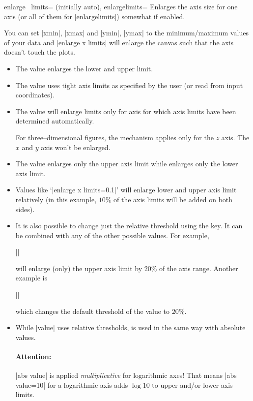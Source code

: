 \begin{pgfplotsxykeylist}{enlarge \x\ limits= (initially auto),
	enlargelimits=}
Enlarges the axis size for one axis (or all of them for |enlargelimits|) somewhat if enabled.

You can set |xmin|, |xmax| and |ymin|, |ymax| to the minimum/maximum values of your data and |enlarge x limits| will enlarge the canvas such that the axis doesn't touch the plots.

\begin{itemize}
	\item The value  enlarges the lower and upper limit.
	\item The value  uses tight axis limits as specified by the user (or read from input coordinates).
	\item The value  will enlarge limits only for axis for which axis limits have been determined automatically.

	For three--dimensional figures, the  mechanism applies only for the $z$ axis. The $x$ and $y$ axis won't be enlarged. 
	\item The value  enlarges only the upper axis limit while  enlarges only the lower axis limit.
	\item Values like `|enlarge x limits=0.1|' will enlarge lower and upper axis limit relatively (in this example, $10\%$ of the axis limits will be added on both sides).
	\item It is also possible to change just the relative threshold using the  key. It can be combined with any of the other possible values. For example, 

		||
	
	will enlarge (only) the upper axis limit by $20\%$ of the axis range. Another example is

		||

	which changes the default threshold of the  value to $20\%$.
	\item While |value| uses relative thresholds,  is used in the same way with absolute values.

	\paragraph{Attention:} |abs value| is applied \emph{multiplicative} for logarithmic axes! That means |abs value=10| for a logarithmic axis adds $\log 10$ to upper and/or lower axis limits.


\end{itemize}
\end{pgfplotsxykeylist}

